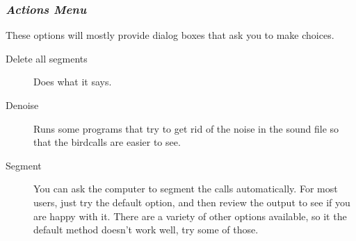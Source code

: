 \documentclass{article}
\begin{document}
\subsubsection{{\em Actions Menu}}
\label{sec:action}

These options will mostly provide dialog boxes that ask you to make choices. 

\begin{description}
\item [Delete all segments] Does what it says. 
\item [Denoise] Runs some programs that try to get rid of the noise in the sound file so that the birdcalls are easier to see. 
\item [Segment] You can ask the computer to segment the calls automatically. 
For most users, just try the default option, and then review the output to see if you are happy with it. There are a variety of other options available, so it the default method doesn't work well, try some of those. 


\end{description}
\end{document}
